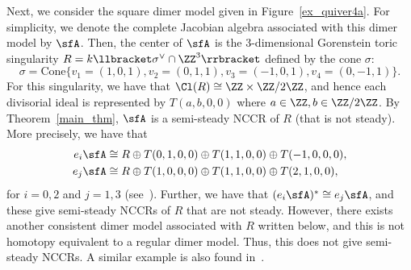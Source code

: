 \begin{exem}\label{ex_semisteady}
Next, we consider the square dimer model given in Figure~\ref{ex_quiver4a}. For simplicity, we denote the complete Jacobian algebra associated with this dimer model by $\sfA$. Then, the center of $\sfA$ is the $3$-dimensional Gorenstein toric singularity $R=k\llbracket \sigma^\vee\cap\ZZ^3\rrbracket $ defined by the cone $\sigma$:
\[
\sigma=\mathrm{Cone}\{v_1=(1,0,1), v_2=(0,1,1), v_3=(-1,0,1), v_4=(0,-1,1) \}.
\]
For this singularity, we have that $\Cl(R)\cong\ZZ\times\ZZ/2\ZZ$, and hence each divisorial ideal is represented by $T(a,b,0,0)$ where $a\in\ZZ, b\in\ZZ/2\ZZ$. By Theorem~\ref{main_thm}, $\sfA$ is a semi-steady NCCR of $R$ (that is not steady). More precisely, we have that
\begin{align*}
e_i\sfA&\cong R\oplus T(0,1,0,0)\oplus T(1,1,0,0)\oplus T(-1,0,0,0), \\
e_j\sfA&\cong R\oplus T(1,0,0,0)\oplus T(1,1,0,0)\oplus T(2,1,0,0), 
\end{align*} 
for $i=0,2$ and $j=1,3$ (see~\cite[Subsection~5.2]{Nak}). Further, we have that $(e_i\sfA)^*\cong e_j\sfA$, and these give semi-steady NCCRs of $R$ that are not steady. However, there exists another consistent dimer model associated with $R$ written below, and this is not homotopy equivalent to a regular dimer model. Thus, this does not give semi-steady NCCRs. A similar example is also found in~\cite[Subsection~5.11]{Nak}.




\begin{center}
{}
\end{center}
\end{exem}
